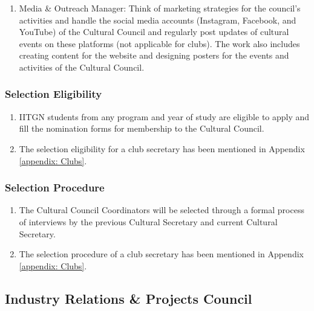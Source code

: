 \documentclass[12pt]{article}
\begin{document}
\begin{enumerate}
\begin{enumerate}
        \item Orenda
        \item Palette
        \item Cinematheque
        \item 16 Pixels
        \item Vinteo
        \item Awaam
    \end{enumerate}
    Refer section \ref{Cultural Clubs} for the details of every club.
    \item Media \& Outreach Manager: Think of marketing strategies for the council’s activities and handle the social media accounts (Instagram, Facebook, and YouTube) of the Cultural Council and regularly post updates of cultural events on these platforms (not applicable for clubs). The work also includes creating content for the website and designing posters for the events and activities of the Cultural Council.

\end{enumerate}

\subsubsection{Selection Eligibility}
\begin{enumerate}
    \item IITGN students from any program and year of study are eligible to apply and fill the nomination forms for membership to the Cultural Council.
    \item The selection eligibility for a club secretary has been mentioned in Appendix \ref{appendix: Clubs}.
\end{enumerate}

\subsubsection{Selection Procedure}
\begin{enumerate}
    \item The Cultural Council Coordinators will be selected through a formal process of interviews by the previous Cultural Secretary and current Cultural Secretary.
    \item The selection procedure of a club secretary has been mentioned in Appendix \ref{appendix: Clubs}.
\end{enumerate}


\newpage
\subsection{Industry Relations \& Projects Council}
\end{document}
